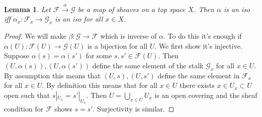 \documentclass[12 pt]{article}
\theoremstyle{plain}
\newtheorem{lem}[thm]{Lemma}
\theoremstyle{definition}
\theoremstyle{remark}
\begin{document}
\begin{lem}
Let $\mathcal{F} \xrightarrow{\alpha} \mathcal{G}$ be a map of sheaves on a top space $X$. Then $\alpha$ is an iso iff $\alpha_x : \mathcal{F}_x \to \mathcal{G}_x$ is an iso for all $x\in X$.
\end{lem}
\begin{proof}
We will make $\beta : \mathcal{G} \to \mathcal{F}$ which is inverse of $\alpha$. To do this it's enough if $\alpha(U) : \mathcal{F}(U) \to \mathcal{G}(U)$ is a bijection for all $U$. We first show it's injective. Suppose $\alpha(s) = \alpha(s')$ for some $s,s' \in \mathcal{F}(U)$. Then $(U, \alpha(s)), (U, \alpha(s'))$ define the same element of the stalk $\mathcal{G}_x$ for all $x\in U$. By assumption this means that $(U,s), (U,s')$ define the same element in $\mathcal{F}_x$ for all $x\in U$. By definition this means that for all $x\in U$ there exists $x \in U_x \subset U$ open such that $s|_{U_x} = s'|_{U_x}$. Then $U = \bigcup_{x\in U} U_x$ is an open covering and the sheaf condition for $\mathcal{F}$ shows $s = s'$. Surjectivity is similar.
\end{proof}
\end{document}
